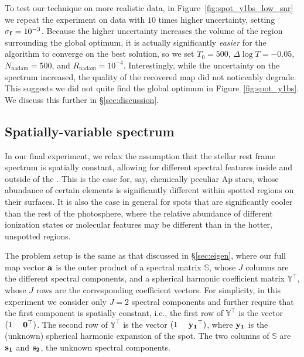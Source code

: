 \documentclass[modern]{aastex631}
\begin{document}
To test our technique on more realistic data, in Figure~\ref{fig:spot_y1bs_low_snr} we repeat the experiment on data with $10$ times higher uncertainty, setting $\sigma_{\mathbf{f}} = 10^{-3}$. 
Because the higher uncertainty increases the volume of the region surrounding the global optimum, it is actually significantly \emph{easier} for the algorithm to converge on the best solution, so we set $T_0 = 500$, $\Delta\log T = -0.05$, $N_\mathrm{nadam} = 500$, and $R_\mathrm{nadam} = 10^{-4}$. 
Interestingly, while the uncertainty on the spectrum increased, the quality of the recovered \spot map did not noticeably degrade. 
This suggests we did not quite find the global optimum in Figure~\ref{fig:spot_y1bs}. 
We discuss this further in \S\ref{sec:discussion}.

\subsection{Spatially-variable spectrum}
\label{sec:twospec}
%
In our final experiment, we relax the assumption that the stellar rest frame spectrum is spatially constant, allowing for different spectral features inside and outside of the \spot. 
This is the case for, say, chemically peculiar Ap stars, whose abundance of certain elements is significantly different within spotted regions on their surfaces. 
It is also the case in general for spots that are significantly cooler than the rest of the photosphere, where the relative abundance of different ionization states or molecular features may be different than in the hotter, unspotted regions.

The problem setup is the same as that discussed in \S\ref{sec:eigen}, where our full map vector ${\mathbf{a}}$ is the outer product of a spectral matrix $\mathbb{S}$, whose $J$ columns are the different spectral components, and a spherical harmonic coefficient matrix $\mathbb{Y}^\top$, whose $J$ rows are the corresponding coefficient vectors. 
For simplicity, in this experiment we consider only $J = 2$ spectral components and further require that the first component is spatially constant, i.e., the first row of $\mathbb{Y}^\top$ is the vector $(1 \quadquad \bvec{0}^\top)$. 
The second row of $\mathbb{Y}^\top$ is the vector $(1 \quadquad \bvec{y_1}^\top)$, where ${\mathbf{y_1}}$ is the (unknown) spherical harmonic expansion of the spot. 
The two columns of $\mathbb{S}$ are ${\mathbf{s_1}}$ and ${\mathbf{s_2}}$, the unknown spectral components.
\end{document}
